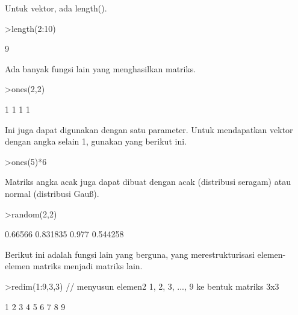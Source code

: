 \documentclass[a4paper,10pt]{article}
\begin{document}
\begin{eulernotebook}
\begin{eulercomment}
\begin{eulercomment}
\begin{eulercomment}
\begin{eulercomment}
\begin{eulercomment}
Untuk vektor, ada length().
\end{eulercomment}
\begin{eulerprompt}
>length(2:10)
\end{eulerprompt}
\begin{euleroutput}
  9
\end{euleroutput}
\begin{eulercomment}
Ada banyak fungsi lain yang menghasilkan matriks.
\end{eulercomment}
\begin{eulerprompt}
>ones(2,2)
\end{eulerprompt}
\begin{euleroutput}
              1             1 
              1             1 
\end{euleroutput}
\begin{eulercomment}
Ini juga dapat digunakan dengan satu parameter. Untuk mendapatkan
vektor dengan angka selain 1, gunakan yang berikut ini.
\end{eulercomment}
\begin{eulerprompt}
>ones(5)*6
\end{eulerprompt}
\begin{euleroutput}
  [6,  6,  6,  6,  6]
\end{euleroutput}
\begin{eulercomment}
Matriks angka acak juga dapat dibuat dengan acak (distribusi seragam)
atau normal (distribusi Gauß).
\end{eulercomment}
\begin{eulerprompt}
>random(2,2)
\end{eulerprompt}
\begin{euleroutput}
        0.66566      0.831835 
          0.977      0.544258 
\end{euleroutput}
\begin{eulercomment}
Berikut ini adalah fungsi lain yang berguna, yang merestrukturisasi
elemen-elemen matriks menjadi matriks lain.
\end{eulercomment}
\begin{eulerprompt}
>redim(1:9,3,3) // menyusun elemen2 1, 2, 3, ..., 9 ke bentuk matriks 3x3
\end{eulerprompt}
\begin{euleroutput}
              1             2             3 
              4             5             6 
              7             8             9 
\end{euleroutput}
\begin{eulercomment}

\end{eulercomment}
\end{eulercomment}
\end{eulercomment}
\end{eulercomment}
\end{eulercomment}
\end{eulernotebook}
\end{document}
